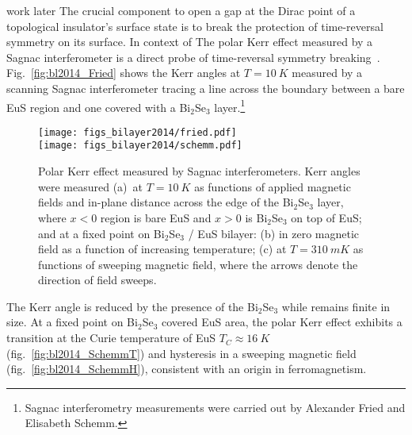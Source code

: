 {\color{red} work later} The crucial component to open a gap at the Dirac point of a topological insulator's surface state is to break the protection of time-reversal symmetry on its surface. In context of  The polar Kerr effect measured by a Sagnac interferometer is a direct probe of time-reversal symmetry breaking~\cite{Xia2006}. Fig.~\ref{fig:bl2014_Fried} shows the Kerr angles at $T=\SI{10}{K}$ measured by a scanning Sagnac interferometer tracing a line across the boundary between a bare EuS region and one covered with a Bi$_2$Se$_3$ layer.\footnote{Sagnac interferometry measurements were carried out by Alexander Fried and Elisabeth Schemm.} %
%
%
\begin{figure}[ht]%
\centering%
\subfloat{\label{fig:bl2014_Fried}}%
\subfloat{\label{fig:bl2014_SchemmT}}%
\subfloat{\label{fig:bl2014_SchemmH}}%
\texttt{[image: figs\_bilayer2014/fried.pdf]}\\
\texttt{[image: figs\_bilayer2014/schemm.pdf]}
\caption[Polar Kerr effect in Bi$_2$Se$_3$ / EuS bilayers]{Polar Kerr effect measured by Sagnac interferometers. Kerr angles were measured (a)~at $T=\SI{10}{K}$ as functions of applied magnetic fields and in-plane distance across the edge of the Bi$_2$Se$_3$ layer, where $x<0$ region is bare EuS and $x>0$ is Bi$_2$Se$_3$ on top of EuS; and at a fixed point on Bi$_2$Se$_3$ / EuS bilayer: (b) in zero magnetic field as a function of increasing temperature; (c) at $T=\SI{310}{mK}$ as functions of sweeping magnetic field, where the arrows denote the direction of field sweeps.}%
\end{figure}%
%
The Kerr angle is reduced by the presence of the Bi$_2$Se$_3$ while remains finite in size. At a fixed point on Bi$_2$Se$_3$ covered EuS area, the polar Kerr effect exhibits a transition at the Curie temperature of EuS $T_C\approx\SI{16}{K}$ (fig.~\ref{fig:bl2014_SchemmT}) and hysteresis in a sweeping magnetic field (fig.~\ref{fig:bl2014_SchemmH}), consistent with an origin in ferromagnetism.

